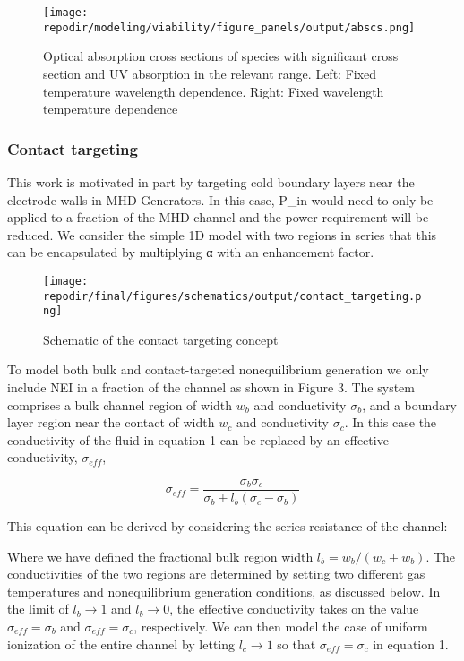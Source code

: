 \begin{figure}[h]
    \texttt{[image: \\repodir/modeling/viability/figure\_panels/output/abscs.png]} 
    \caption{Optical absorption cross sections of species with significant cross section and UV absorption in the relevant range. Left: Fixed temperature wavelength dependence. Right: Fixed wavelength temperature dependence}
    \label{fig:SI_UV_abscs}
\end{figure}


\subsubsection{Contact targeting}


This work is motivated in part by targeting cold boundary layers near the electrode walls in MHD Generators. In this case, P\_in would need to only be applied to a fraction of the MHD channel and the power requirement will be reduced. We consider the simple 1D model with two regions in series that this can be encapsulated by multiplying α with an enhancement factor.



\begin{figure}[h]
    \texttt{[image: \\repodir/final/figures/schematics/output/contact\_targeting.png]} 
    \caption{Schematic of the contact targeting concept}
    \label{fig:SI_contact_targeting_schematic}
\end{figure}


To model both bulk and contact-targeted nonequilibrium generation we only include NEI in a fraction of the channel as shown in Figure 3. The system comprises a bulk channel region of width $w_{b}$ and conductivity $\sigma_{b}$, and a boundary layer region near the contact of width $w_{c}$ and conductivity $\sigma_{c}$. In this case the conductivity of the fluid in equation 1 can be replaced by an effective conductivity, $\sigma_{eff}$, 

\[
\sigma_{eff}=\frac{\sigma_{b} \sigma_{c}}{\sigma_{b}+l_{b}  (\sigma_{c}  -\sigma_{b})}
\]

This equation can be derived by considering the series resistance of the channel:

Where we have defined the fractional bulk region width $l_{b}=w_{b}/(w_{c}+w_{b})$. The conductivities of the two regions are determined by setting two different gas temperatures and nonequilibrium generation conditions, as discussed below. In the limit of $l_{b}\rightarrow1$ and $l_{b}\rightarrow0$, the effective conductivity takes on the value $\sigma_{eff}= \sigma_{b}$ and $\sigma_{eff}= \sigma_{c}$, respectively. We can then model the case of uniform ionization of the entire channel by letting $l_{c}\rightarrow1$ so that $\sigma_{eff}= \sigma_{c}$ in equation 1. 

